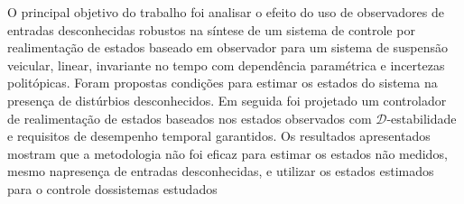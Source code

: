 O principal objetivo do trabalho foi analisar o efeito do uso de observadores de entradas desconhecidas robustos na síntese de um sistema de controle por realimentação de estados baseado em observador para um sistema de suspensão veicular, linear, invariante no tempo com dependência paramétrica e incertezas politópicas. Foram propostas condições para estimar os estados do sistema na presença de distúrbios desconhecidos.  
Em seguida foi projetado um controlador de realimentação de estados baseados nos estados observados com \( \mathcal{D}\)-estabilidade e requisitos de desempenho temporal garantidos. Os resultados apresentados mostram que a metodologia não foi eficaz para estimar os estados não medidos, mesmo napresença de entradas desconhecidas, e utilizar os estados estimados para o controle dossistemas estudados